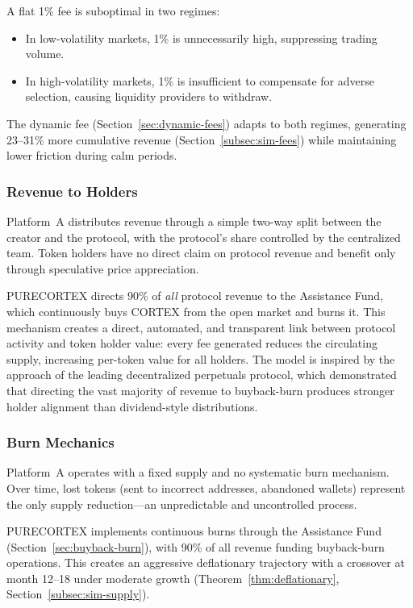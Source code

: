 A flat 1\% fee is suboptimal in two regimes:
\begin{itemize}
  \item In low-volatility markets, 1\% is unnecessarily high, suppressing
    trading volume.
  \item In high-volatility markets, 1\% is insufficient to compensate for
    adverse selection, causing liquidity providers to withdraw.
\end{itemize}

The dynamic fee (Section~\ref{sec:dynamic-fees}) adapts to both regimes,
generating 23--31\% more cumulative revenue
(Section~\ref{subsec:sim-fees}) while maintaining lower friction during calm
periods.

\subsubsection{Revenue to Holders}

Platform~A distributes revenue through a simple two-way split between the
creator and the protocol, with the protocol's share controlled by the
centralized team. Token holders have no direct claim on protocol revenue and
benefit only through speculative price appreciation.

PURECORTEX directs 90\% of \emph{all} protocol revenue to the Assistance Fund,
which continuously buys CORTEX from the open market and burns it. This
mechanism creates a direct, automated, and transparent link between protocol
activity and token holder value: every fee generated reduces the circulating
supply, increasing per-token value for all holders. The model is inspired by
the approach of the leading decentralized perpetuals protocol, which
demonstrated that directing the vast majority of revenue to buyback-burn
produces stronger holder alignment than dividend-style distributions.

\subsubsection{Burn Mechanics}

Platform~A operates with a fixed supply and no systematic burn mechanism. Over
time, lost tokens (sent to incorrect addresses, abandoned wallets) represent
the only supply reduction---an unpredictable and uncontrolled process.

PURECORTEX implements continuous burns through the Assistance Fund
(Section~\ref{sec:buyback-burn}), with 90\% of all revenue funding buyback-burn
operations. This creates an aggressive deflationary trajectory with a crossover
at month 12--18 under moderate growth (Theorem~\ref{thm:deflationary},
Section~\ref{subsec:sim-supply}).

